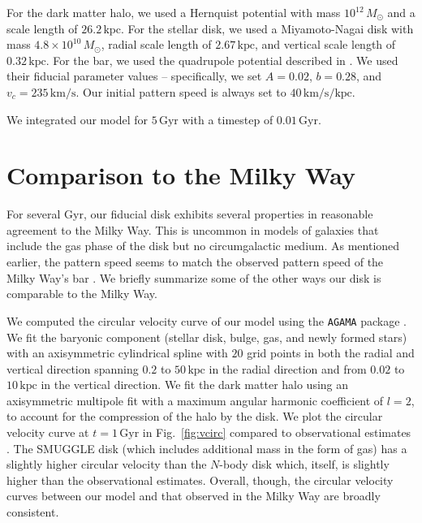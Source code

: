 \documentclass[twocolumn,linenumbers,trackchanges]{aastex631}
\newcommand{\kms}{\ensuremath{\textrm{km}/\textrm{s}}}
\newcommand{\Nbody}{$N$-body}
\newcommand{\SMUGGLE}{SMUGGLE}
\newcommand{\Msun}{\ensuremath{M_{\odot}}}
\begin{document}
For the dark matter halo, we used a Hernquist potential
\citep{1990ApJ...356..359H} with mass $10^{12}\,\Msun$ and a scale length of
$26.2\,\textrm{kpc}$. For the stellar disk, we used a Miyamoto-Nagai disk
\citep{1975PASJ...27..533M} with mass $4.8\times10^{10}\,\Msun$, radial scale
length of $2.67\,\textrm{kpc}$, and vertical scale length of
$0.32\,\textrm{kpc}$. For the bar, we used the quadrupole potential described in
\citet{2022MNRAS.513..768C}. We used their fiducial parameter values --
specifically, we set $A=0.02$, $b=0.28$, and $v_c = 235\,\kms$. Our initial
pattern speed is always set to $40\,\kms/\textrm{kpc}$.

We integrated our model for $5\,\textrm{Gyr}$ with a timestep of
$0.01\,\textrm{Gyr}$.

\section{Comparison to the Milky Way}
\label{app:milkyway}
For several Gyr, our fiducial disk exhibits several properties in reasonable
agreement to the Milky Way. This is uncommon in models of galaxies that include
the gas phase of the disk but no circumgalactic medium. As mentioned earlier,
the pattern speed seems to match the observed pattern speed of the Milky Way's
bar \citep{2019MNRAS.490.4740B}. We briefly summarize some of the other ways our
disk is comparable to the Milky Way.

We computed the circular velocity curve of our model using the \texttt{AGAMA}
package \citep{2019MNRAS.482.1525V}. We fit the baryonic component (stellar
disk, bulge, gas, and newly formed stars) with an axisymmetric cylindrical
spline with $20$ grid points in both the radial and vertical direction spanning
$0.2$ to $50\,\textrm{kpc}$ in the radial direction and from $0.02$ to
$10\,\textrm{kpc}$ in the vertical direction. We fit the dark matter halo using
an axisymmetric multipole fit with a maximum angular harmonic coefficient
of $l=2$, to account for the compression of the halo by the disk. We plot
the circular velocity curve at $t=1\,\textrm{Gyr}$ in Fig.~\ref{fig:vcirc}
compared to observational estimates \citep{2019ApJ...871..120E}. The \SMUGGLE{}
disk (which includes additional mass in the form of gas) has a slightly higher
circular velocity than the \Nbody{} disk which, itself, is slightly higher than
the observational estimates. Overall, though, the circular velocity curves
between our model and that observed in the Milky Way are broadly consistent.
\end{document}
